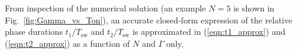 \begin{figure}[b]
\begin{minipage}{0.3\linewidth}
%
%


\end{minipage}
\vspace{-1.5em}
\end{figure}


From inspection of the numerical solution (an example $N=5$ is shown in Fig.~\ref{fig:Gamma_vs_Ton}), an accurate closed-form expression of the relative phase durations $t_1/T_{\textrm{sw}}$ and $t_2/T_{\textrm{sw}}$ is approximated in (\ref{eqn:t1_approx}) and (\ref{eqn:t2_approx}) as a function of $N$ and $\Gamma$ only.

